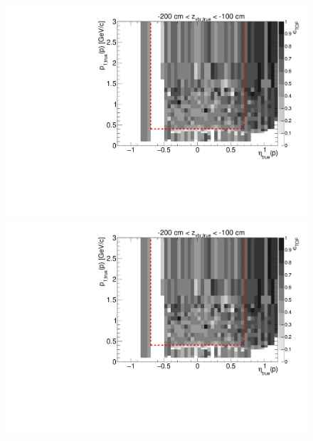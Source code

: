 \begin{figure}[hb]
{  \includegraphics[width=\linewidth,page=16]{graphics/eff/Eff2D_TOF_proton_Minus.pdf}\\
  \includegraphics[width=\linewidth,page=18]{graphics/eff/Eff2D_TOF_proton_Minus.pdf}
}%
\end{figure}


